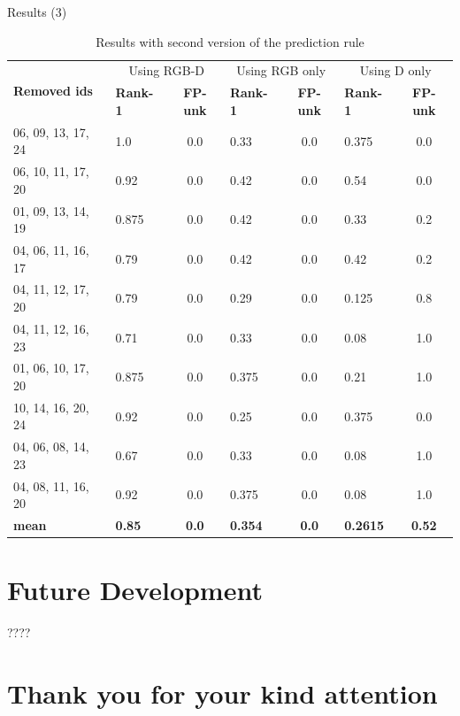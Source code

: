\documentclass{beamer}
\begin{document}
\begin{frame}{Results (3)}
	\scriptsize
	\begin{table}[]
		\centering
		\caption{Results with second version of the prediction rule}
		\begin{tabular}{|l|l|c|l|c|l|c|}
			\hline
			\multirow{2}{*}{\bf Removed ids} & \multicolumn{2}{c|}{Using RGB-D} &\multicolumn{2}{c|}{Using RGB only} &\multicolumn{2}{c|}{Using D only} \\ \cline{2-7}
							 & \bf Rank-1 & \bf FP-unk          & \bf Rank-1 & \bf FP-unk            & \bf Rank-1 & \bf FP-unk  \\ \hline

			06, 09, 13, 17, 24               & 1.0        & 0.0                 & 0.33       & 0.0                   & 0.375      & 0.0\\ \hline
			06, 10, 11, 17, 20               & 0.92       & 0.0                 & 0.42       & 0.0                   & 0.54       & 0.0\\ \hline
			01, 09, 13, 14, 19               & 0.875      & 0.0                 & 0.42       & 0.0                   & 0.33       & 0.2\\ \hline
			04, 06, 11, 16, 17               & 0.79       & 0.0                 & 0.42       & 0.0                   & 0.42       & 0.2\\ \hline
			04, 11, 12, 17, 20               & 0.79       & 0.0                 & 0.29       & 0.0                   & 0.125      & 0.8\\ \hline
			04, 11, 12, 16, 23               & 0.71       & 0.0                 & 0.33       & 0.0                   & 0.08       & 1.0\\ \hline
			01, 06, 10, 17, 20               & 0.875      & 0.0                 & 0.375      & 0.0                   & 0.21       & 1.0\\ \hline
			10, 14, 16, 20, 24               & 0.92       & 0.0                 & 0.25       & 0.0                   & 0.375      & 0.0\\ \hline
			04, 06, 08, 14, 23               & 0.67       & 0.0                 & 0.33       & 0.0                   & 0.08       & 1.0\\ \hline
			04, 08, 11, 16, 20               & 0.92       & 0.0                 & 0.375      & 0.0                   & 0.08       & 1.0\\ \hline
			\bf mean                         & \bf 0.85   & \bf 0.0             & \bf 0.354  & \bf 0.0               & \bf 0.2615 & \bf 0.52\\ \hline
		\end{tabular}
	\end{table}


\end{frame}
\section{Future Development}
\begin{frame}
	????
\end{frame}

\section*{Thank you for your kind attention}
\end{document}
